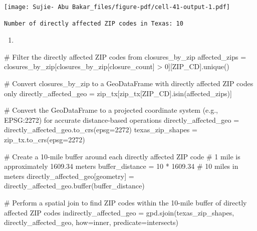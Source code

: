 \documentclass[
  letterpaper,
  DIV=11,
  numbers=noendperiod]{scrartcl}
\newenvironment{Shaded}{\begin{snugshade}}{\end{snugshade}}
\newcommand{\BuiltInTok}[1]{\textcolor[rgb]{0.00,0.23,0.31}{#1}}
\newcommand{\CommentTok}[1]{\textcolor[rgb]{0.37,0.37,0.37}{#1}}
\newcommand{\DecValTok}[1]{\textcolor[rgb]{0.68,0.00,0.00}{#1}}
\newcommand{\FloatTok}[1]{\textcolor[rgb]{0.68,0.00,0.00}{#1}}
\newcommand{\NormalTok}[1]{\textcolor[rgb]{0.00,0.23,0.31}{#1}}
\newcommand{\OperatorTok}[1]{\textcolor[rgb]{0.37,0.37,0.37}{#1}}
\newcommand{\StringTok}[1]{\textcolor[rgb]{0.13,0.47,0.30}{#1}}
\providecommand{\tightlist}{%
  \setlength{\itemsep}{0pt}\setlength{\parskip}{0pt}}\usepackage{longtable,booktabs,array}
\begin{document}
\texttt{[image: Sujie- Abu Bakar\_files/figure-pdf/cell-41-output-1.pdf]}

\begin{verbatim}
Number of directly affected ZIP codes in Texas: 10
\end{verbatim}

\begin{enumerate}
\def\labelenumi{\arabic{enumi}.}
\setcounter{enumi}{2}
\tightlist
\item
\end{enumerate}

\begin{Shaded}
\begin{Highlighting}[]
\CommentTok{\# Filter the directly affected ZIP codes from \textasciigrave{}closures\_by\_zip\textasciigrave{}}
\NormalTok{affected\_zips }\OperatorTok{=}\NormalTok{ closures\_by\_zip[closures\_by\_zip[}\StringTok{\textquotesingle{}closure\_count\textquotesingle{}}\NormalTok{] }\OperatorTok{\textgreater{}} \DecValTok{0}\NormalTok{][}\StringTok{\textquotesingle{}ZIP\_CD\textquotesingle{}}\NormalTok{].unique()}

\CommentTok{\# Convert \textasciigrave{}closures\_by\_zip\textasciigrave{} to a GeoDataFrame with directly affected ZIP codes only}
\NormalTok{directly\_affected\_geo }\OperatorTok{=}\NormalTok{ zip\_tx[zip\_tx[}\StringTok{\textquotesingle{}ZIP\_CD\textquotesingle{}}\NormalTok{].isin(affected\_zips)]}

\CommentTok{\# Convert the GeoDataFrame to a projected coordinate system (e.g., EPSG:2272) for accurate distance{-}based operations}
\NormalTok{directly\_affected\_geo }\OperatorTok{=}\NormalTok{ directly\_affected\_geo.to\_crs(epsg}\OperatorTok{=}\DecValTok{2272}\NormalTok{)}
\NormalTok{texas\_zip\_shapes }\OperatorTok{=}\NormalTok{ zip\_tx.to\_crs(epsg}\OperatorTok{=}\DecValTok{2272}\NormalTok{)}

\CommentTok{\# Create a 10{-}mile buffer around each directly affected ZIP code}
\CommentTok{\# 1 mile is approximately 1609.34 meters}
\NormalTok{buffer\_distance }\OperatorTok{=} \DecValTok{10} \OperatorTok{*} \FloatTok{1609.34}  \CommentTok{\# 10 miles in meters}
\NormalTok{directly\_affected\_geo[}\StringTok{\textquotesingle{}geometry\textquotesingle{}}\NormalTok{] }\OperatorTok{=}\NormalTok{ directly\_affected\_geo.}\BuiltInTok{buffer}\NormalTok{(buffer\_distance)}

\CommentTok{\# Perform a spatial join to find ZIP codes within the 10{-}mile buffer of directly affected ZIP codes}
\NormalTok{indirectly\_affected\_geo }\OperatorTok{=}\NormalTok{ gpd.sjoin(texas\_zip\_shapes, directly\_affected\_geo, how}\OperatorTok{=}\StringTok{\textquotesingle{}inner\textquotesingle{}}\NormalTok{, predicate}\OperatorTok{=}\StringTok{\textquotesingle{}intersects\textquotesingle{}}\NormalTok{)}


\end{Highlighting}
\end{Shaded}
\end{document}
